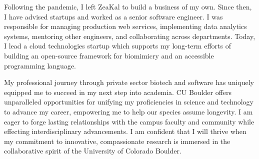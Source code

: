 \documentclass[12pt]{article}
\begin{document}
Following the pandemic, I left ZeaKal to build a business of my own. Since then, I have advised startups and worked as a senior software engineer. I was responsible for managing production web services, implementing data analytics systems, mentoring other engineers, and collaborating across departments. Today, I lead a cloud technologies startup which supports my long-term efforts of building an open-source framework for biomimicry and an accessible programming language.

My professional journey through private sector biotech and software has uniquely equipped me to succeed in my next step into academia. CU Boulder offers unparalleled opportunities for unifying my proficiencies in science and technology to advance my career, empowering me to help our species assume longevity. I am eager to forge lasting relationships with the campus faculty and community while effecting interdisciplinary advancements. I am confident that I will thrive when my commitment to innovative, compassionate research is immersed in the collaborative spirit of the University of Colorado Boulder.
\end{document}
